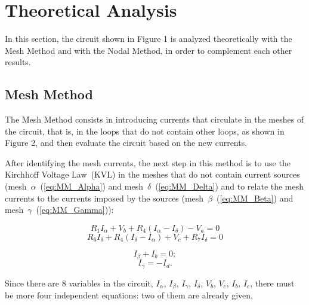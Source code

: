 \section{Theoretical Analysis}
\label{sec:analysis}

In this section, the circuit shown in Figure 1 is analyzed theoretically with the Mesh Method and with the Nodal Method, in order to complement each other results.

\subsection{Mesh Method}


The Mesh Method consists in introducing currents that circulate in the meshes of the circuit, that is, in the loops that do not contain other loops, as shown in Figure 2, and then evaluate the circuit based on the new currents.

After identifying the mesh currents, the next step in this method is to use the Kirchhoff Voltage Law~(KVL) in the meshes that do not contain current sources (mesh~$\alpha$~(\ref{eq:MM_Alpha}) and mesh~$\delta$~(\ref{eq:MM_Delta}) and to relate the mesh currents to the currents imposed by the sources (mesh~$\beta$~(\ref{eq:MM_Beta}) and mesh~$\gamma$~(\ref{eq:MM_Gamma})):

\begin{equation}
  R_1I_{\alpha} + V_b + R_4(I_{\alpha}-I_{\delta}) - V_a = 0
  \label{eq:MM_Alpha}
\end{equation}
\begin{equation}
  R_6I_{\delta} + R_4(I_{\delta}-I_{\alpha}) + V_c + R_7I_{\delta} = 0
  \label{eq:MM_Delta}
\end{equation}

\begin{equation}
  I_{\beta} + I_b = 0;
  \label{eq:MM_Beta}
\end{equation}
\begin{equation}
  I_{\gamma} = - I_d.
  \label{eq:MM_Gamma}
\end{equation}

Since there are 8 variables in the circuit, $I_{\alpha}$, $I_{\beta}$, $I_{\gamma}$, $I_{\delta}$, $V_b$, $V_c$, $I_b$, $I_c$, there must be more four independent equations: two of them are already given,

